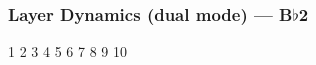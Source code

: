 \subsubsection{Layer Dynamics (dual mode) --- \UiKey{\SET}B$\flat$2}










































1
2
3
4
5
6
7
8
9
10
